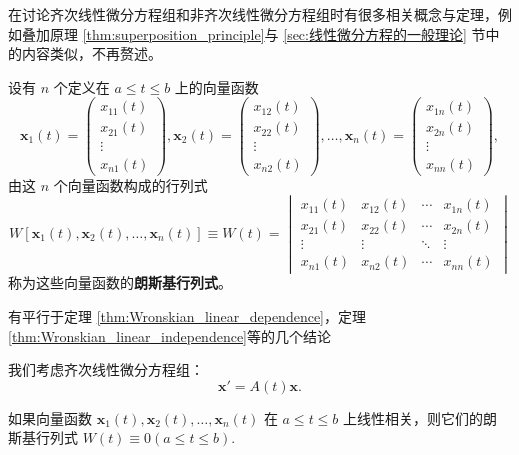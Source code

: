 在讨论齐次线性微分方程组和非齐次线性微分方程组时有很多相关概念与定理，例如叠加原理 \ref{thm:superposition_principle}与 \ref{sec:线性微分方程的一般理论} 节中的内容类似，不再赘述。

\begin{definition}[向量函数的Wronsky行列式]\label{def:向量函数的Wronsky行列式}
    设有 $n$ 个定义在 $a \le t \le b$ 上的向量函数
$$\mathbf{x}_1(t)=\begin{pmatrix} x_{11}(t) \\ x_{21}(t) \\ \vdots \\ x_{n1}(t) \end{pmatrix}, \mathbf{x}_2(t)=\begin{pmatrix} x_{12}(t) \\ x_{22}(t) \\ \vdots \\ x_{n2}(t) \end{pmatrix}, \dots, \mathbf{x}_n(t)=\begin{pmatrix} x_{1n}(t) \\ x_{2n}(t) \\ \vdots \\ x_{nn}(t) \end{pmatrix},$$
由这 $n$ 个向量函数构成的行列式
$$W[\mathbf{x}_1(t), \mathbf{x}_2(t), \dots, \mathbf{x}_n(t)] \equiv W(t) = \begin{vmatrix}
x_{11}(t) & x_{12}(t) & \cdots & x_{1n}(t) \\
x_{21}(t) & x_{22}(t) & \cdots & x_{2n}(t) \\
\vdots & \vdots & \ddots & \vdots \\
x_{n1}(t) & x_{n2}(t) & \cdots & x_{nn}(t)
\end{vmatrix}$$
称为这些向量函数的\textbf{朗斯基行列式}。
\end{definition}
\begin{remark}
    有平行于定理 \ref{thm:Wronskian_linear_dependence}，定理\ref{thm:Wronskian_linear_independence}等的几个结论
\end{remark}

我们考虑齐次线性微分方程组：
\begin{equation}
\mathbf{x}'=A(t)\mathbf{x}. \label{eq:homogeneous_matrix_DE_system}
\end{equation}

\begin{theorem}[朗斯基行列式与向量函数线性相关性]\label{thm:Wronskian_linear_dependence_vector}
如果向量函数 $\mathbf{x}_1(t), \mathbf{x}_2(t), \dots, \mathbf{x}_n(t)$ 在 $a \le t \le b$ 上线性相关，则它们的朗
斯基行列式 $W(t) \equiv 0 (a \le t \le b)$.
\end{theorem}

